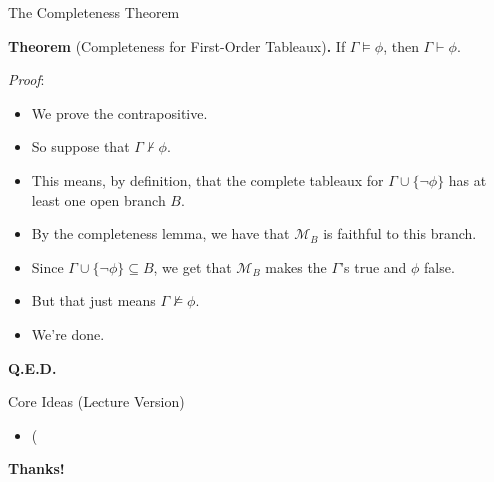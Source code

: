 \documentclass[../slides.tex]{subfiles}
\begin{document}
\begin{frame}{The Completeness Theorem}

  \textbf{Theorem} (Completeness for First-Order Tableaux)\textbf{.}
  If $\Gamma\vDash\phi$, then $\Gamma\vdash\phi$.

  \emph{Proof}:

  \begin{itemize}
  \item We prove the contrapositive.

  \item So suppose that $\Gamma\nvdash\phi$.

    \item This means, by definition, that the complete tableaux for
      $\Gamma\cup\{\neg\phi\}$ has at least one open branch $B$.

      \item By the completeness lemma, we have that $\mathcal{M}_B$ is
        faithful to this branch.

        \item Since $\Gamma\cup\{\neg\phi\}\subseteq B$, we get that
          $\mathcal{M}_B$ makes the $\Gamma$'s true and $\phi$ false.

        \item But that just means $\Gamma\nvDash\phi$.

          \item We're done.
  \end{itemize}

\end{frame}

\begin{frame}

  \vfill

  \begin{center}
  {\Large \textbf{Q.E.D.}}
\end{center}
  
\end{frame}


\begin{frame}{Core Ideas (Lecture Version)}

  \begin{itemize}

  \item (
    
  \end{itemize}

\end{frame}

\begin{frame}

	\begin{center}
	{\huge\bf Thanks!}
	\end{center}

\end{frame}
\end{document}
